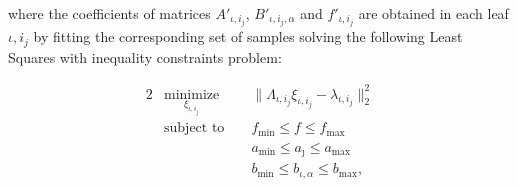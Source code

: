 \noindent where the coefficients of matrices $A'_{\iota,i_j}$, $B'_{\iota,i_j,\alpha}$ and $f'_{\iota,i_j}$ are obtained in each leaf $\iota,i_j$ by fitting the corresponding set of samples solving the following Least Squares with inequality constraints problem:

\begin{problem}\label{pbLeastSquareProblem}
	\begin{alignat}{2}
		& \nonumber \underset{\xi_{\iota,i_j}}{\text{minimize}} & &  \parallel \Lambda_{\iota,i_j} \xi_{\iota,i_j}  - \lambda_{\iota,i_j} \parallel_2^2   		 \\
		& \text{subject to }    \nonumber            & &  f_\mathrm{min} \leq f \leq f_\mathrm{max}    										  					 \\
		&                  					    	 & &  a_\mathrm{min} \leq a_{\jmath} \leq a_\mathrm{max}\label{eqInequalityConstraints} \\
		& 	                    \nonumber			 & &  b_\mathrm{min} \leq b_{\iota,\alpha} \leq b_\mathrm{max},
	\end{alignat}
\end{problem}


